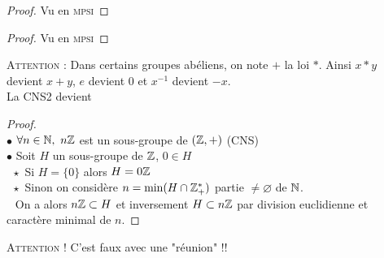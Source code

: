 		\begin{proof}
		Vu en \textsc{mpsi}
		\end{proof} \medskip
		
		
		\begin{proof}
		Vu en \textsc{mpsi}
		\end{proof} \medskip
		
		\textsc{Attention} : Dans certains groupes abéliens, on note $+$ la loi $\ast$. Ainsi $x\ast y$ devient $x+y$, $e$ devient $0$ et $x^{-1}$ devient $-x$.\\
		
		La CNS2 devient \\
		
		
		
		\begin{proof} ${}$ \\
		$\bullet$ $\forall n\in{\mathbb{N}} ,~n{\mathbb{Z}}$ est un sous-groupe de $({\mathbb{Z}},+)$ (CNS)\\
		$\bullet$ Soit $H$ un sous-groupe de ${\mathbb{Z}}$, $0\in H$\\
		$~~\star $ Si $H=\{0\}$ alors $H=0{\mathbb{Z}}$\\
		$~~\star$ Sinon on considère $n=\min (H\cap{\mathbb{Z}}_+^*)$ partie $\neq \varnothing$ de ${\mathbb{N}}$. \\ $~~$ On a alors $n{\mathbb{Z}}\subset H$ et inversement $H\subset n{\mathbb{Z}}$ par division euclidienne et caractère minimal de $n$.
		\end{proof} \medskip
		
		
		\textsc{Attention !}  C'est faux avec une "réunion" !!
		
